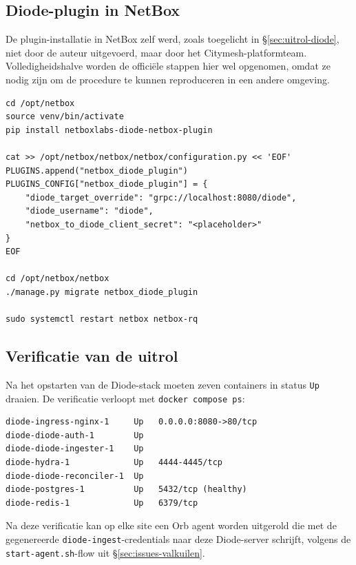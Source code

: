 \subsection{Diode-plugin in NetBox}

De plugin-installatie in NetBox zelf werd, zoals toegelicht in \S\ref{sec:uitrol-diode}, niet door de auteur uitgevoerd, maar door het Citymesh-platformteam. Volledigheidshalve worden de officiële stappen hier wel opgenomen, omdat ze nodig zijn om de procedure te kunnen reproduceren in een andere omgeving.

\begin{listing}[H]
  \caption[Installatie van de Diode-plugin in NetBox]{Installatie van de Diode-plugin in NetBox (uitgevoerd door het Citymesh-platformteam, \S\ref{sec:uitrol-diode})}
  \label{lst:diode-plugin-install}
  \begin{verbatim}
cd /opt/netbox
source venv/bin/activate
pip install netboxlabs-diode-netbox-plugin

cat >> /opt/netbox/netbox/netbox/configuration.py << 'EOF'
PLUGINS.append("netbox_diode_plugin")
PLUGINS_CONFIG["netbox_diode_plugin"] = {
    "diode_target_override": "grpc://localhost:8080/diode",
    "diode_username": "diode",
    "netbox_to_diode_client_secret": "<placeholder>"
}
EOF

cd /opt/netbox/netbox
./manage.py migrate netbox_diode_plugin

sudo systemctl restart netbox netbox-rq
  \end{verbatim}
\end{listing}

\subsection{Verificatie van de uitrol}

Na het opstarten van de Diode-stack moeten zeven containers in status \texttt{Up} draaien. De verificatie verloopt met \texttt{docker compose ps}:

\begin{listing}[H]
  \caption[Verificatie van de Diode-stack via \texttt{docker compose ps}]{Verificatie van de Diode-stack via \texttt{docker compose ps}}
  \label{lst:diode-verify}
  \begin{verbatim}
diode-ingress-nginx-1     Up   0.0.0.0:8080->80/tcp
diode-diode-auth-1        Up
diode-diode-ingester-1    Up
diode-hydra-1             Up   4444-4445/tcp
diode-diode-reconciler-1  Up
diode-postgres-1          Up   5432/tcp (healthy)
diode-redis-1             Up   6379/tcp
  \end{verbatim}
\end{listing}

Na deze verificatie kan op elke site een Orb agent worden uitgerold die met de gegenereerde \texttt{diode-ingest}-credentials naar deze Diode-server schrijft, volgens de \texttt{start-agent.sh}-flow uit \S\ref{sec:issues-valkuilen}.
